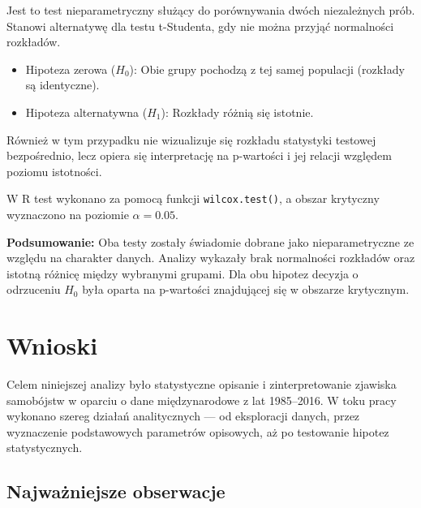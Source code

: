 \documentclass[polish]{article}
\begin{document}
    Jest to test nieparametryczny służący do porównywania dwóch niezależnych prób. Stanowi alternatywę dla testu t-Studenta, gdy nie można przyjąć normalności rozkładów.

    \begin{itemize}
        \item Hipoteza zerowa (\(H_0\)): Obie grupy pochodzą z tej samej populacji (rozkłady są identyczne).
        \item Hipoteza alternatywna (\(H_1\)): Rozkłady różnią się istotnie.
    \end{itemize}

    Również w tym przypadku nie wizualizuje się rozkładu statystyki testowej bezpośrednio, lecz opiera się interpretację na p-wartości i jej relacji względem poziomu istotności.

    W R test wykonano za pomocą funkcji \texttt{wilcox.test()}, a obszar krytyczny wyznaczono na poziomie \( \alpha = 0.05 \).

    \bigskip

    \textbf{Podsumowanie:}
    Oba testy zostały świadomie dobrane jako nieparametryczne ze względu na charakter danych. Analizy wykazały brak normalności rozkładów oraz istotną różnicę między wybranymi grupami. Dla obu hipotez decyzja o odrzuceniu \( H_0 \) była oparta na p-wartości znajdującej się w obszarze krytycznym.

    \newpage

    \section{Wnioski}

    Celem niniejszej analizy było statystyczne opisanie i zinterpretowanie zjawiska samobójstw w oparciu o dane międzynarodowe z lat 1985–2016. W toku pracy wykonano szereg działań analitycznych — od eksploracji danych, przez wyznaczenie podstawowych parametrów opisowych, aż po testowanie hipotez statystycznych.

    \subsection*{Najważniejsze obserwacje}
\end{document}
